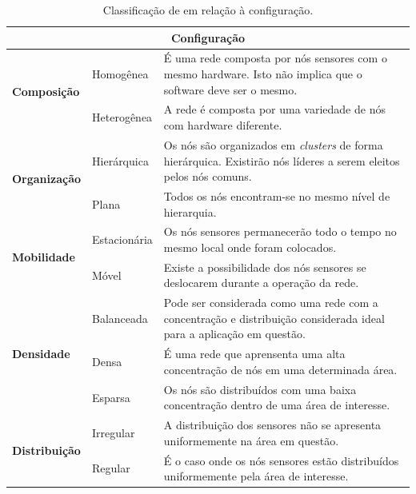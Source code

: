 \begin{table}[h!]
\centering
\small
	\begin{tabular}{ | l | l | p{8.0cm} | }
		\hline
		\multicolumn{3}{|c|}{\textbf{Configuração}} \\
		\hline

		\multirow{2}{*}{\textbf{Composição}}
				 & Homogênea & É uma rede composta por nós sensores com o mesmo hardware. Isto não implica que o software deve ser o mesmo. \\ 
				\cline{2-3}
			       	& Heterogênea &  A rede é composta por uma variedade de nós com hardware diferente.  \\
		\hline

		\multirow{2}{*}{\textbf{Organização}}
			& Hierárquica & Os nós são organizados em \emph{clusters} de forma hierárquica. Existirão nós líderes a serem eleitos pelos nós comuns.\\
			\cline{2-3}
			& Plana & Todos os nós encontram-se no mesmo nível de hierarquia. \\
		\hline

		\multirow{2}{*}{\textbf{Mobilidade}}
			& Estacionária & Os nós sensores permanecerão todo o tempo no mesmo local onde foram colocados. \\
			\cline{2-3}
			& Móvel & Existe a possibilidade dos nós sensores se deslocarem durante a operação da rede.\\
		\hline

		\multirow{3}{*}{\textbf{Densidade}}
			& Balanceada & Pode ser considerada como uma rede com a concentração e distribuição considerada ideal para a aplicação em questão.\\
			\cline{2-3}
			& Densa & É uma rede que aprensenta uma alta concentração de nós em uma determinada área. \\
			\cline{2-3}
			& Esparsa & Os nós são distribuídos com uma baixa concentração dentro de uma área de interesse. \\
		\hline

		\multirow{2}{*}{\textbf{Distribuição}}
			& Irregular & A distribuição dos sensores não se apresenta uniformemente na área em questão. \\
			\cline{2-3}
			& Regular & É o caso onde os nós sensores estão distribuídos uniformemente pela área de interesse.\\
		\hline
	\end{tabular}

	\caption{Classificação de \rssfs em relação à configuração.}
	\label{tbl:configuração}
\end{table}


